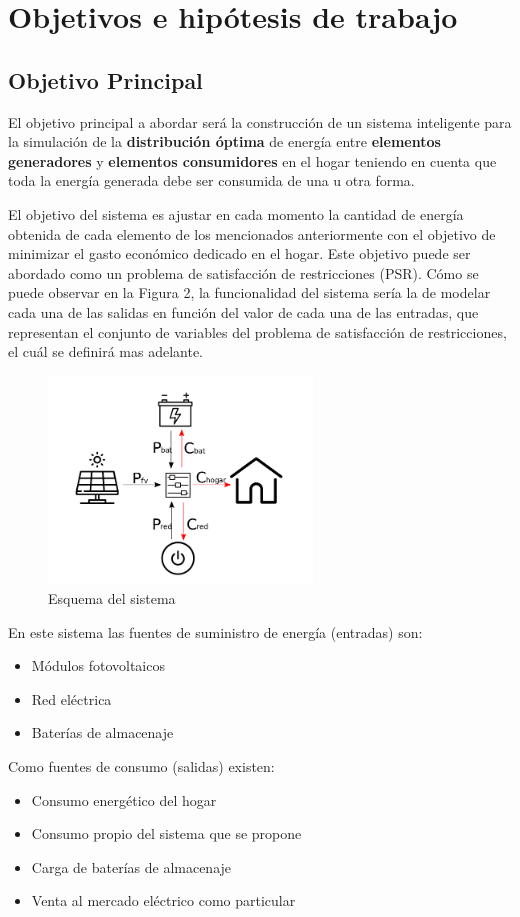 \chapter{Objetivos e hipótesis de trabajo}
\label{cap:Objetivo}


\section{Objetivo Principal}
El objetivo principal a abordar será la construcción de un sistema inteligente para la simulación de la \textbf{distribución óptima} de energía entre \textbf{elementos generadores} y \textbf{elementos consumidores} en el hogar teniendo en cuenta que toda la energía generada debe ser consumida de una u otra forma.

El objetivo del sistema es ajustar en cada momento la cantidad de energía obtenida de cada elemento de los mencionados anteriormente con el objetivo de minimizar el gasto económico dedicado en el hogar.
Este objetivo puede ser abordado como un problema de satisfacción de restricciones (PSR).
Cómo se puede observar en la Figura 2, la funcionalidad del sistema sería la de modelar cada una de las salidas en función del valor de cada una de las entradas, que representan el conjunto de variables del problema de satisfacción de restricciones, el cuál se definirá mas adelante.

\begin{figure}[!h]
	\centering
	\includegraphics[width=7cm]{figs/Esquema.png}
	\caption{Esquema del sistema}
\end{figure}

En este sistema las fuentes de suministro de energía (entradas) son:
\begin{itemize}
	\item Módulos fotovoltaicos
	\item Red eléctrica
	\item Baterías de almacenaje
\end{itemize}
Como fuentes de consumo (salidas) existen:
\begin{itemize}
	\item Consumo energético del hogar
	\item Consumo propio del sistema que se propone
	\item Carga de baterías de almacenaje
	\item Venta al mercado eléctrico como particular
\end{itemize}

